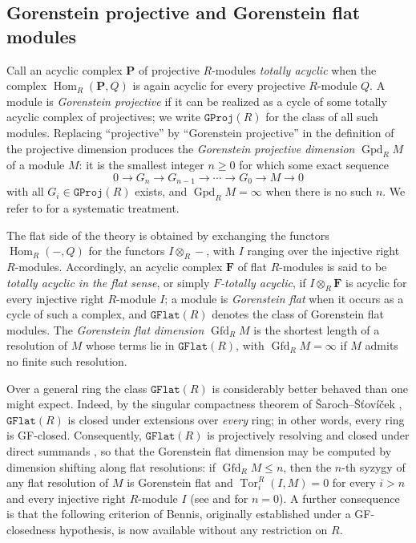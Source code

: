\documentclass[12pt]{amsart}
\theoremstyle{remark}
\theoremstyle{definition}
\theoremstyle{plain}
\DeclareMathOperator{\Gfd}{Gfd}
\DeclareMathOperator{\Gpd}{Gpd}
\DeclareMathOperator{\Hom}{Hom}
\DeclareMathOperator{\Tor}{Tor}
\newcommand{\GFlat}{\mathtt{GFlat}}
\newcommand{\GProj}{\mathtt{GProj}}
\begin{document}
\subsection{Gorenstein projective and Gorenstein flat modules}

Call an acyclic complex $\mathbf P$ of projective $R$-modules \emph{totally acyclic} when the complex $\Hom_R(\mathbf P,Q)$ is again acyclic for every projective $R$-module $Q$. A module is \emph{Gorenstein projective} if it can be realized as a cycle of some totally acyclic complex of projectives; we write $\GProj(R)$ for the class of all such modules. Replacing ``projective'' by ``Gorenstein projective'' in the definition of the projective dimension produces the \emph{Gorenstein projective dimension} $\Gpd_RM$ of a module $M$: it is the smallest integer $n\ge0$ for which some exact sequence
\[
0\rightarrow G_n\rightarrow G_{n-1}\rightarrow\cdots\rightarrow G_0\rightarrow M\rightarrow0
\]
with all $G_i\in\GProj(R)$ exists, and $\Gpd_RM=\infty$ when there is no such $n$. We refer to \cite{EJ,Hol} for a systematic treatment.

The flat side of the theory is obtained by exchanging the functors $\Hom_R(-,Q)$ for the functors $I\otimes_R-$, with $I$ ranging over the injective right $R$-modules. Accordingly, an acyclic complex $\mathbf F$ of flat $R$-modules is said to be \emph{totally acyclic in the flat sense}, or simply \emph{$F$-totally acyclic}, if $I\otimes_R\mathbf F$ is acyclic for every injective right $R$-module $I$; a module is \emph{Gorenstein flat} when it occurs as a cycle of such a complex, and $\GFlat(R)$ denotes the class of Gorenstein flat modules. The \emph{Gorenstein flat dimension} $\Gfd_RM$ is the shortest length of a resolution of $M$ whose terms lie in $\GFlat(R)$, with $\Gfd_RM=\infty$ if $M$ admits no finite such resolution.

Over a general ring the class $\GFlat(R)$ is considerably better behaved than one might expect. Indeed, by the singular compactness theorem of \v{S}aroch--\v{S}\v{t}ov\'i\v{c}ek \cite[Corollary~4.12]{SS}, $\GFlat(R)$ is closed under extensions over \emph{every} ring; in other words, every ring is GF-closed. Consequently, $\GFlat(R)$ is projectively resolving and closed under direct summands \cite{SS,Ben}, so that the Gorenstein flat dimension may be computed by dimension shifting along flat resolutions: if $\Gfd_RM\le n$, then the $n$-th syzygy of any flat resolution of $M$ is Gorenstein flat and $\Tor^R_i(I,M)=0$ for every $i>n$ and every injective right $R$-module $I$ (see \cite[Theorem~2.8]{Ben} and \cite[Lemma~2.4]{Ben} for $n=0$). A further consequence is that the following criterion of Bennis, originally established under a GF-closedness hypothesis, is now available without any restriction on $R$.
\end{document}
